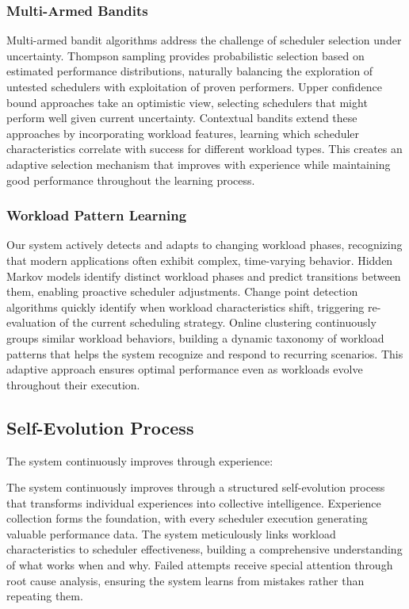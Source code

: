 \subsubsection{Multi-Armed Bandits}
Multi-armed bandit algorithms address the challenge of scheduler selection under uncertainty. Thompson sampling provides probabilistic selection based on estimated performance distributions, naturally balancing the exploration of untested schedulers with exploitation of proven performers. Upper confidence bound approaches take an optimistic view, selecting schedulers that might perform well given current uncertainty. Contextual bandits extend these approaches by incorporating workload features, learning which scheduler characteristics correlate with success for different workload types. This creates an adaptive selection mechanism that improves with experience while maintaining good performance throughout the learning process.

\subsubsection{Workload Pattern Learning}
Our system actively detects and adapts to changing workload phases, recognizing that modern applications often exhibit complex, time-varying behavior. Hidden Markov models identify distinct workload phases and predict transitions between them, enabling proactive scheduler adjustments. Change point detection algorithms quickly identify when workload characteristics shift, triggering re-evaluation of the current scheduling strategy. Online clustering continuously groups similar workload behaviors, building a dynamic taxonomy of workload patterns that helps the system recognize and respond to recurring scenarios. This adaptive approach ensures optimal performance even as workloads evolve throughout their execution.

\subsection{Self-Evolution Process}

The system continuously improves through experience:

The system continuously improves through a structured self-evolution process that transforms individual experiences into collective intelligence. Experience collection forms the foundation, with every scheduler execution generating valuable performance data. The system meticulously links workload characteristics to scheduler effectiveness, building a comprehensive understanding of what works when and why. Failed attempts receive special attention through root cause analysis, ensuring the system learns from mistakes rather than repeating them.

